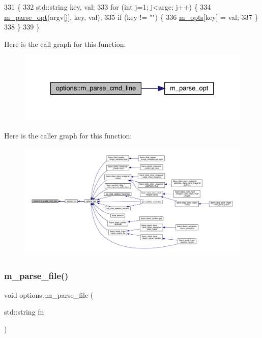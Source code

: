 \begin{DoxyCode}
331 \{
332   std::string key, val;
333   \textcolor{keywordflow}{for} (\textcolor{keywordtype}{int} j=1; j<argc; j++) \{
334     \hyperlink{options_8cpp_a18f37a1b6f36c00656e52d130c2132d2}{m\_parse\_opt}(argv[j], key, val);
335     \textcolor{keywordflow}{if} (key != \textcolor{stringliteral}{""}) \{
336       \hyperlink{classoptions_ac73507ca925d98ee5ff6f04937dff5c3}{m\_opts}[key] = val;
337     \}
338   \}
339 \}
\end{DoxyCode}
Here is the call graph for this function\+:\nopagebreak
\begin{figure}[H]
\begin{center}
\leavevmode
\includegraphics[width=329pt]{classoptions_a441540f2a8990edaa17fe95b013f9168_cgraph}
\end{center}
\end{figure}
Here is the caller graph for this function\+:\nopagebreak
\begin{figure}[H]
\begin{center}
\leavevmode
\includegraphics[width=350pt]{classoptions_a441540f2a8990edaa17fe95b013f9168_icgraph}
\end{center}
\end{figure}
\mbox{\label{classoptions_abeab2c3e2cf5c1809e09601a3835d967}} 
\subsubsection{\texorpdfstring{m\+\_\+parse\+\_\+file()}{m\_parse\_file()}}
{\footnotesize\ttfamily void options\+::m\+\_\+parse\+\_\+file (\begin{DoxyParamCaption}\item[{std\+::string}]{fn }\end{DoxyParamCaption})\hspace{0.3cm}{\ttfamily [private]}}



